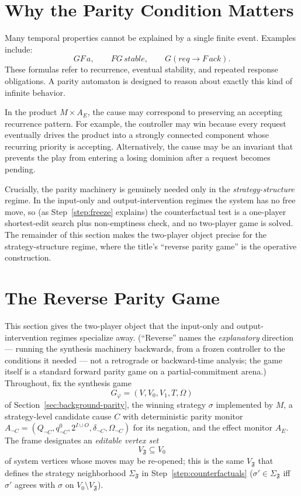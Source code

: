 \documentclass[11pt]{article}
\theoremstyle{remark}
\newcommand{\Frame}{\mathfrak{F}}
\begin{document}
\section{Why the Parity Condition Matters}

Many temporal properties cannot be explained by a single finite event. Examples
include:
\[
  GF\,a,\qquad
  FG\,stable,\qquad
  G(req\rightarrow F\,ack).
\]
These formulas refer to recurrence, eventual stability, and repeated response
obligations. A parity automaton is designed to reason about exactly this kind of
infinite behavior.

In the product \(M\times A_E\), the cause may correspond to preserving an
accepting recurrence pattern. For example, the controller may win because every
request eventually drives the product into a strongly connected component whose
recurring priority is accepting. Alternatively, the cause may be an invariant
that prevents the play from entering a losing dominion after a request becomes
pending.

Crucially, the parity machinery is genuinely needed only in the
\emph{strategy-structure} regime. In the input-only and output-intervention
regimes the system has no free move, so (as Step~\ref{step:freeze} explains) the
counterfactual test is a one-player shortest-edit search plus non-emptiness check,
and no two-player game is solved. The remainder of this section makes the two-player object precise
for the strategy-structure regime, where the title's ``reverse parity game'' is
the operative construction.

\section{The Reverse Parity Game}
\label{sec:rpg}

This section gives the two-player object that the input-only and
output-intervention regimes specialize away. (``Reverse'' names the
\emph{explanatory} direction --- running the synthesis machinery backwards, from a
frozen controller to the conditions it needed --- not a retrograde or
backward-time analysis; the game itself is a standard forward parity game on a
partial-commitment arena.) Throughout, fix the synthesis game
\[
  G_\varphi=(V,V_0,V_1,T,\Omega)
\]
of Section~\ref{sec:background-parity}, the winning strategy \(\sigma\)
implemented by \(M\), a strategy-level candidate cause \(C\) with deterministic
parity monitor \(A_{\neg C}=(Q_{\neg C},q^{0}_{\neg C},2^{I\cup O},\delta_{\neg
C},\Omega_{\neg C})\) for its negation, and the effect monitor \(A_E\). The frame
designates an \emph{editable vertex set}
\[
  V_{\Frame}\subseteq V_0
\]
of system vertices whose moves may be re-opened; this is the same
\(V_{\Frame}\) that defines the strategy neighborhood \(\Sigma_{\Frame}\) in
Step~\ref{step:counterfactuals} (\(\sigma'\in\Sigma_{\Frame}\) iff \(\sigma'\)
agrees with \(\sigma\) on \(V_0\setminus V_{\Frame}\)).
\end{document}
